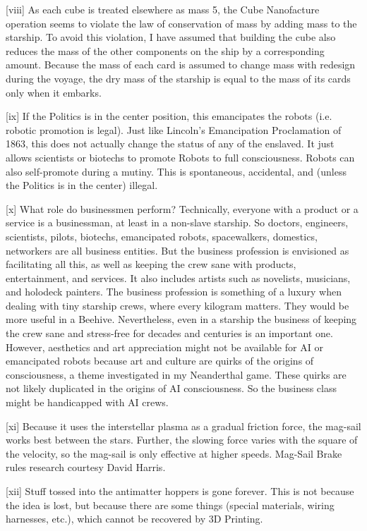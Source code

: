\documentclass[a4paper]{book}
\begin{document}
[viii] As each cube is treated elsewhere as mass 5, the Cube Nanofacture operation seems to violate the law of conservation of mass by adding mass to the starship. To avoid this violation, I have assumed that building the cube also reduces the mass of the other components on the ship by a corresponding amount. Because the mass of each card is assumed to change mass with redesign during the voyage, the dry mass of the starship is equal to the mass of its cards only when it embarks.
 
[ix] If the Politics is in the center position, this emancipates the robots (i.e. robotic promotion is legal). Just like Lincoln’s Emancipation Proclamation of 1863, this does not actually change the status of any of the enslaved. It just allows scientists or biotechs to promote Robots to full consciousness. Robots can also self-promote during a mutiny. This is spontaneous, accidental, and (unless the Politics is in the center) illegal.

[x] What role do businessmen perform?  Technically, everyone with a product or a service is a businessman, at least in a non-slave starship. So doctors, engineers, scientists, pilots, biotechs, emancipated robots, spacewalkers, domestics, networkers are all business entities. But the business profession is envisioned as facilitating all this, as well as keeping the crew sane with products, entertainment, and services. It also includes artists such as novelists, musicians, and holodeck painters. The business profession is something of a luxury when dealing with tiny starship crews, where every kilogram matters. They would be more useful in a Beehive. Nevertheless, even in a starship the business of keeping the crew sane and stress-free for decades and centuries is an important one. However, aesthetics and art appreciation might not be available for AI or emancipated robots because art and culture are quirks of the origins of consciousness, a theme investigated in my Neanderthal game.  These quirks are not likely duplicated in the origins of AI consciousness.  So the business class might be handicapped with AI crews.

[xi] Because it uses the interstellar plasma as a gradual friction force, the mag-sail works best between the stars. Further, the slowing force varies with the square of the velocity, so the mag-sail is only effective at higher speeds. Mag-Sail Brake rules research courtesy David Harris.
 
[xii] Stuff tossed into the antimatter hoppers is gone forever. This is not because the idea is lost, but because there are some things (special materials, wiring harnesses, etc.), which cannot be recovered by 3D Printing.
 
\end{document}
